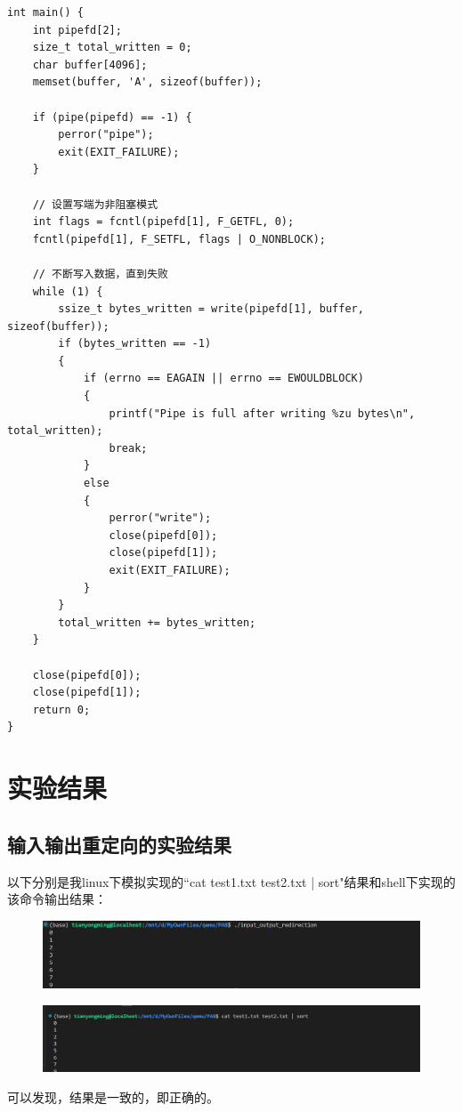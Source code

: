 \documentclass{LabReport}
\begin{document}
	\begin{lstlisting}
int main() {
	int pipefd[2];
	size_t total_written = 0;
	char buffer[4096];  
	memset(buffer, 'A', sizeof(buffer));
	
	if (pipe(pipefd) == -1) {
		perror("pipe");
		exit(EXIT_FAILURE);
	}
	
	// 设置写端为非阻塞模式
	int flags = fcntl(pipefd[1], F_GETFL, 0);
	fcntl(pipefd[1], F_SETFL, flags | O_NONBLOCK);
	
	// 不断写入数据，直到失败
	while (1) {
		ssize_t bytes_written = write(pipefd[1], buffer, sizeof(buffer));
		if (bytes_written == -1) 
		{
			if (errno == EAGAIN || errno == EWOULDBLOCK) 
			{
				printf("Pipe is full after writing %zu bytes\n", total_written);
				break;
			} 
			else 
			{
				perror("write");
				close(pipefd[0]);
				close(pipefd[1]);
				exit(EXIT_FAILURE);
			}
		}
		total_written += bytes_written;
	}
	
	close(pipefd[0]);
	close(pipefd[1]);
	return 0;
}
	\end{lstlisting}
	

	\section{实验结果}
	
	\subsection{输入输出重定向的实验结果}
	以下分别是我linux下模拟实现的``cat test1.txt test2.txt | sort"结果和shell下实现的该命令输出结果：
\begin{figure}[h!]
	\centering
	\includegraphics[width=\linewidth]{figures/my_output_true}
	\caption{}
	\label{fig:myoutputtrue}
\end{figure}

\begin{figure}[h!]
	\centering
	\includegraphics[width=\linewidth]{figures/standard_output}
	\caption{}
	\label{fig:standardoutput}
\end{figure}
	可以发现，结果是一致的，即正确的。
	
\end{document}

